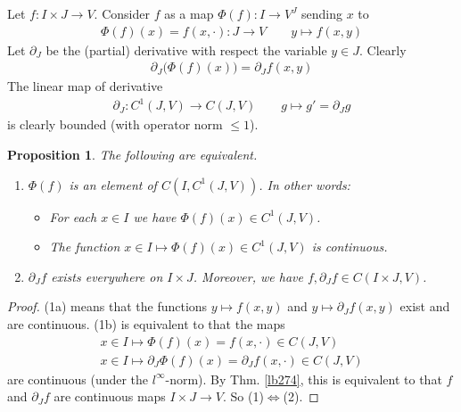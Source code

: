 \documentclass[12pt,b5paper,notitlepage]{article}
\theoremstyle{definition}
\theoremstyle{plain}
\newtheorem{pp}[df]{Proposition}
\numberwithin{equation}{section}
\begin{document}
Let $f:I\times J\rightarrow V$. Consider $f$ as a map $\Phi(f):I\rightarrow V^J$ sending $x$ to
\begin{align}
\Phi(f)(x)=f(x,\cdot):J\rightarrow V\qquad  y\mapsto f(x,y)
\end{align}
Let $\partial_J$ be the (partial) derivative with respect the variable $y\in J$. Clearly
\begin{align}
\partial_J\big(\Phi(f)(x)\big)=\partial_Jf(x,y)
\end{align}
The linear map of derivative
\begin{align}
\partial_J:C^1(J,V)\rightarrow C(J,V)\qquad g\mapsto g'=\partial_Jg
\end{align}
is clearly bounded (with operator norm $\leq 1$).

\begin{pp}
The following are equivalent.
\begin{enumerate}[label=(\arabic*)]
\item $\Phi(f)$ is an element of $C(I,C^1(J,V))$. In other words:
\begin{itemize}
\item[(1a)] For each $x\in I$ we have $\Phi(f)(x)\in C^1(J,V)$.
\item[(1b)] The function $x\in I\mapsto \Phi(f)(x)\in C^1(J,V)$ is continuous.
\end{itemize}
\item $\partial_Jf$ exists everywhere on $I\times J$. Moreover, we have $f,\partial_Jf\in C(I\times J,V)$. 
\end{enumerate}
\end{pp}



\begin{proof}
(1a) means that the functions $y\mapsto f(x,y)$ and $y\mapsto \partial_Jf(x,y)$ exist and are continuous. (1b) is equivalent to that the maps
\begin{gather*}
x\in I\mapsto\Phi(f)(x)=f(x,\cdot)\in C(J,V)\\
x\in I\mapsto \partial_J\Phi(f)(x)=\partial_Jf(x,\cdot)\in C(J,V)
\end{gather*}
are continuous (under the $l^\infty$-norm). By Thm. \ref{lb274}, this is equivalent to that $f$ and $\partial_Jf$ are continuous maps $I\times J\rightarrow V$. So (1)$\Leftrightarrow$(2).
\end{proof}
\end{document}
